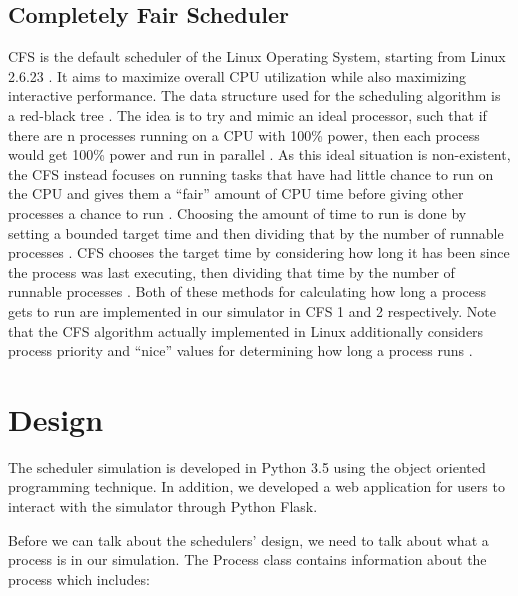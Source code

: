 \documentclass[a4paper]{article}
\begin{document}
\subsection{Completely Fair Scheduler}
CFS is the default scheduler of the Linux Operating System, starting from Linux 2.6.23 \cite{cfs-kernel-design}. It aims to maximize overall CPU utilization while also maximizing interactive performance. The data structure used for the scheduling algorithm is a red-black tree \cite{cfs-kernel-design}. The idea is to try and mimic an ideal processor, such that if there are n processes running on a CPU with 100\% power, then each process would get 100\% power and run in parallel \cite{cfs-kernel-design}. As this ideal situation is non-existent, the CFS instead focuses on running tasks that have had little chance to run on the CPU and gives them a “fair” amount of CPU time before giving other processes a chance to run \cite{cfs-kernel-design}. Choosing the amount of time to run is done by setting a bounded target time and then dividing that by the number of runnable processes \cite{ishkov}. CFS chooses the target time by considering how long it has been since the process was last executing, then dividing that time by the number of runnable processes \cite{ishkov}. Both of these methods for calculating how long a process gets to run are implemented in our simulator in CFS 1 and 2 respectively. Note that the CFS algorithm actually implemented in Linux additionally considers process priority and “nice” values for determining how long a process runs \cite{ishkov}.


\section{Design}
\label{sec:design}
The scheduler simulation is developed in Python 3.5 using the object oriented programming technique. In addition, we developed a web application for users to interact with the simulator through Python Flask.  

Before we can talk about the schedulers’ design, we need to talk about what a process is in our simulation. The Process class contains information about the process which includes:
\end{document}
